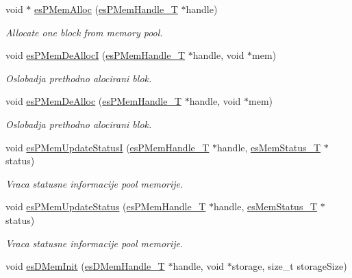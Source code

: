 \begin{DoxyCompactItemize}
void $\ast$ \hyperlink{group__mem__impl_gac750c9ec7780f5dc616e8a04a6668f34}{es\-P\-Mem\-Alloc} (\hyperlink{group__mem__intf_gaf82f01d26c4f6bc9a2b672a673b09ce2}{es\-P\-Mem\-Handle\-\_\-\-T} $\ast$handle)
\begin{DoxyCompactList}\small\item\em Allocate one block from memory pool. \end{DoxyCompactList}\item 
void \hyperlink{group__mem__impl_ga2c0f1b135c5639809b17dfe44e06f1b5}{es\-P\-Mem\-De\-Alloc\-I} (\hyperlink{group__mem__intf_gaf82f01d26c4f6bc9a2b672a673b09ce2}{es\-P\-Mem\-Handle\-\_\-\-T} $\ast$handle, void $\ast$mem)
\begin{DoxyCompactList}\small\item\em Oslobadja prethodno alocirani blok. \end{DoxyCompactList}\item 
void \hyperlink{group__mem__impl_gacd393e705fe5531cae380cc9b68f7a23}{es\-P\-Mem\-De\-Alloc} (\hyperlink{group__mem__intf_gaf82f01d26c4f6bc9a2b672a673b09ce2}{es\-P\-Mem\-Handle\-\_\-\-T} $\ast$handle, void $\ast$mem)
\begin{DoxyCompactList}\small\item\em Oslobadja prethodno alocirani blok. \end{DoxyCompactList}\item 
void \hyperlink{group__mem__impl_gab568f5b51f11f2bc315412c35bfc28e9}{es\-P\-Mem\-Update\-Status\-I} (\hyperlink{group__mem__intf_gaf82f01d26c4f6bc9a2b672a673b09ce2}{es\-P\-Mem\-Handle\-\_\-\-T} $\ast$handle, \hyperlink{group__mem__intf_ga0eb568b68247d93e2db804a681de0e9e}{es\-Mem\-Status\-\_\-\-T} $\ast$status)
\begin{DoxyCompactList}\small\item\em Vraca statusne informacije pool memorije. \end{DoxyCompactList}\item 
void \hyperlink{group__mem__impl_ga8148d4ad98ed5e9ecc04b7983433555e}{es\-P\-Mem\-Update\-Status} (\hyperlink{group__mem__intf_gaf82f01d26c4f6bc9a2b672a673b09ce2}{es\-P\-Mem\-Handle\-\_\-\-T} $\ast$handle, \hyperlink{group__mem__intf_ga0eb568b68247d93e2db804a681de0e9e}{es\-Mem\-Status\-\_\-\-T} $\ast$status)
\begin{DoxyCompactList}\small\item\em Vraca statusne informacije pool memorije. \end{DoxyCompactList}\item 
void \hyperlink{group__mem__impl_ga10ef80121c0c742b9ad81f24eff91c7f}{es\-D\-Mem\-Init} (\hyperlink{group__mem__intf_gacaaf771b18b3da8fa3b67a466390080e}{es\-D\-Mem\-Handle\-\_\-\-T} $\ast$handle, void $\ast$storage, size\-\_\-t storage\-Size)

\end{DoxyCompactItemize}
